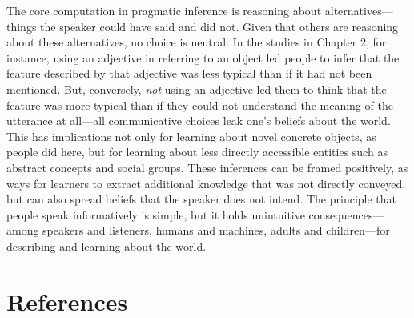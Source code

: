 \documentclass{ucetd}
\begin{document}
The core computation in pragmatic inference is reasoning about
alternatives---things the speaker could have said and did not. Given
that others are reasoning about these alternatives, no choice is
neutral. In the studies in Chapter 2, for instance, using an adjective
in referring to an object led people to infer that the feature described
by that adjective was less typical than if it had not been mentioned.
But, conversely, \emph{not} using an adjective led them to think that
the feature was more typical than if they could not understand the
meaning of the utterance at all---all communicative choices leak one's
beliefs about the world. This has implications not only for learning
about novel concrete objects, as people did here, but for learning about
less directly accessible entities such as abstract concepts and social
groups. These inferences can be framed positively, as ways for learners
to extract additional knowledge that was not directly conveyed, but can
also spread beliefs that the speaker does not intend. The principle that
people speak informatively is simple, but it holds unintuitive
consequences---among speakers and listeners, humans and machines, adults
and children---for describing and learning about the world.

\newpage

\hypertarget{references}{%
\chapter*{References}\label{references}}
\end{document}
